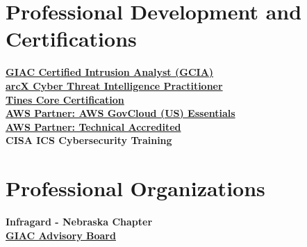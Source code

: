 \documentclass[a4paper,10pt]{article}
\begin{document}
\section*{Professional Development and Certifications}
\href{https://www.credly.com/badges/87563fff-910c-449c-ab21-f571b162cd4b/public_url}{\textbf{GIAC Certified Intrusion Analyst (GCIA)}}\\
\href{https://arcx.io/verify-certificate?id=2991f7743ca358a0f528c32e6685a7f68ffcd332&k=387d43ca09294cb6a13b2ed95eccb859}{\textbf{arcX Cyber Threat Intelligence Practitioner}}\\
\href{https://certification.tines.com/certificate/qTQkd1xZ7Q}{\textbf{Tines Core Certification}}\\
\href{https://www.credly.com/badges/f1f32bab-c511-4114-b884-e69ae2506275/public_url}{\textbf{AWS Partner: AWS GovCloud (US) Essentials}}\\
\href{https://www.credly.com/badges/4c4eef78-ec4f-4911-ae68-dc4a4c811ba2/public_url}{\textbf{AWS Partner: Technical Accredited}}\\
\textbf{CISA ICS Cybersecurity Training}
\section*{Professional Organizations}
\textbf{Infragard - Nebraska Chapter} \\
\href{https://www.credly.com/badges/a65cec63-e07c-4e52-b154-842564aadf65/public_url}{\textbf{GIAC Advisory Board}}
\end{document}

